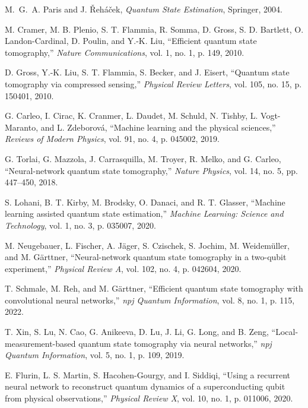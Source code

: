 \documentclass[conference]{IEEEtran}
\begin{document}
\begin{thebibliography}{10}

M.~G.~A. Paris and J. Řeháček, \emph{Quantum State Estimation}, Springer, 2004.

M. Cramer, M. B. Plenio, S. T. Flammia, R. Somma, D. Gross, S. D. Bartlett, O. Landon-Cardinal, D. Poulin, and Y.-K. Liu, ``Efficient quantum state tomography,'' \emph{Nature Communications}, vol. 1, no. 1, p. 149, 2010.

D. Gross, Y.-K. Liu, S. T. Flammia, S. Becker, and J. Eisert, ``Quantum state tomography via compressed sensing,'' \emph{Physical Review Letters}, vol. 105, no. 15, p. 150401, 2010.

G. Carleo, I. Cirac, K. Cranmer, L. Daudet, M. Schuld, N. Tishby, L. Vogt-Maranto, and L. Zdeborová, ``Machine learning and the physical sciences,'' \emph{Reviews of Modern Physics}, vol. 91, no. 4, p. 045002, 2019.

G. Torlai, G. Mazzola, J. Carrasquilla, M. Troyer, R. Melko, and G. Carleo, ``Neural-network quantum state tomography,'' \emph{Nature Physics}, vol. 14, no. 5, pp. 447--450, 2018.

S. Lohani, B. T. Kirby, M. Brodsky, O. Danaci, and R. T. Glasser, ``Machine learning assisted quantum state estimation,'' \emph{Machine Learning: Science and Technology}, vol. 1, no. 3, p. 035007, 2020.

M. Neugebauer, L. Fischer, A. Jäger, S. Czischek, S. Jochim, M. Weidemüller, and M. Gärttner, ``Neural-network quantum state tomography in a two-qubit experiment,'' \emph{Physical Review A}, vol. 102, no. 4, p. 042604, 2020.

T. Schmale, M. Reh, and M. Gärttner, ``Efficient quantum state tomography with convolutional neural networks,'' \emph{npj Quantum Information}, vol. 8, no. 1, p. 115, 2022.

T. Xin, S. Lu, N. Cao, G. Anikeeva, D. Lu, J. Li, G. Long, and B. Zeng, ``Local-measurement-based quantum state tomography via neural networks,'' \emph{npj Quantum Information}, vol. 5, no. 1, p. 109, 2019.

E. Flurin, L. S. Martin, S. Hacohen-Gourgy, and I. Siddiqi, ``Using a recurrent neural network to reconstruct quantum dynamics of a superconducting qubit from physical observations,'' \emph{Physical Review X}, vol. 10, no. 1, p. 011006, 2020.


\end{thebibliography}
\end{document}
